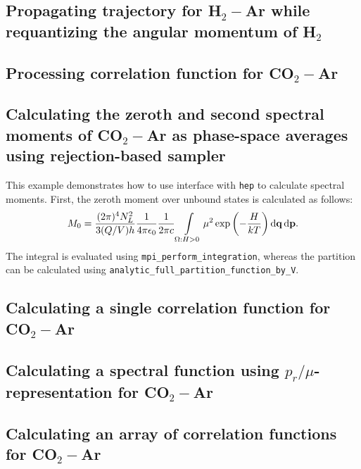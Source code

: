 \documentclass{article}
\newcommand{\lb}{\left(}
\newcommand{\rb}{\right)}
\newcommand{\mf}{\mathbf}
\newcommand*\diff{\mathop{}\!\mathrm{d}}
\begin{document}
\subsection{Propagating trajectory for H$_2-$Ar while requantizing the angular momentum of H$_2$}
\label{subsec:example-req-trajectory}


\subsection{Processing correlation function for CO$_2-$Ar}
\label{subsec:example-processing}


\subsection{Calculating the zeroth and second spectral moments of CO$_2-$Ar as phase-space averages using rejection-based sampler}
\label{subsec:example-spmoments-co2-ar}

This example demonstrates how to use interface with \texttt{hep} to calculate spectral moments. 
First, the zeroth moment over unbound states is calculated as follows:
\begin{gather}
    M_0 = \frac{(2 \pi)^4 N_L^2}{3 (Q/V) h} \frac{1}{4 \pi \epsilon_0} \frac{1}{2 \pi c} \int\limits_{\Omega: H > 0} \mu^2 \exp \lb -\frac{H}{kT} \rb \diff{\mf{q}} \diff{\mf{p}}. \notag
\end{gather}
%
The integral is evaluated using \texttt{mpi\_perform\_integration}, whereas the partition can be calculated using \texttt{analytic\_full\_partition\_function\_by\_V}.    


\subsection{Calculating a single correlation function for CO$_2-$Ar}
\label{subsec:example-correlation-co2-ar}

\subsection{Calculating a spectral function using $p_r/\mu$-representation for CO$_2-$Ar}
\label{subsec:example-prmu-co2-ar}

\subsection{Calculating an array of correlation functions for CO$_2-$Ar}
\label{subsec:example-correlation-array-co2-ar}
\end{document}
